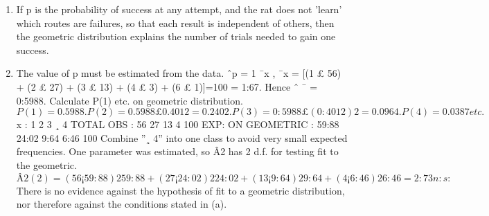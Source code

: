 \documentclass[a4paper,12pt]{article}
\begin{document}
\begin{enumerate}
\item If p is the probability of success at any attempt, and the rat does not ’learn’ which routes are
failures, so that each result is independent of others, then the geometric distribution explains the
number of trials needed to gain one success.
\item The value of p must be estimated from the data.
ˆp = 1
¯x , ¯x = [(1 £ 56) + (2 £ 27) + (3 £ 13) + (4 £ 3) + (6 £ 1)]=100 = 1:67.
Hence ˆ ¯ = 0:5988. Calculate P(1) etc. on geometric distribution.
\[P(1)=0.5988 . P(2)=0.5988£0.4012=0.2402 .
P(3)=0:5988 £ (0:4012)2=0.0964 . P(4)=0.0387 etc.\]
x : 1 2 3 ¸ 4 TOTAL
OBS : 56 27 13 4 100
EXP: ON GEOMETRIC : 59:88 24:02 9:64 6:46 100
Combine ”¸ 4” into one class to avoid very small expected frequencies. One parameter was
estimated, so Â2 has 2 d.f. for testing fit to the geometric.
\[Â2
(2) =
(56 ¡ 59:88)2
59:88
+
(27 ¡ 24:02)2
24:02
+
(13 ¡ 9:64)2
9:64
+
(4 ¡ 6:46)2
6:46
= 2:73 n:s:\]
There is no evidence against the hypothesis of fit to a geometric distribution, nor therefore against
the conditions stated in (a).
\end{enumerate}
\end{document}
